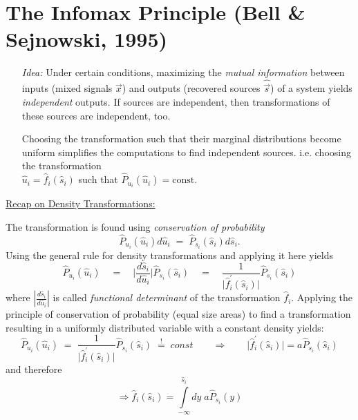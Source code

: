 
\section{The Infomax Principle (Bell \& Sejnowski, 1995)}

\begin{itemize}
\item[\emph{Idea:}] Under certain conditions, maximizing the
  \emph{mutual information} between inputs (mixed signals $\vec x$) and outputs
  (recovered sources $\widehat{\vec s}$) of a system yields \emph{independent} outputs. 
  If sources are independent, then
  transformations of these sources are independent, too.
  
  Choosing the transformation such that their marginal distributions become uniform 
  simplifies the computations to find independent sources. i.e. choosing the transformation \\
$\widehat{u}_i = \widehat{f}_i(\widehat{s}_i)$ such that
$\widehat{P}_{u_i}(\widehat{u}_i) = \mathrm{const.}$

\end{itemize}

\underline{Recap on Density Transformations:}

The transformation is found using \emph{conservation of probability}
\begin{equation}
	\widehat{P}_{u_i}(\widehat{u}_i) d \widehat{u}_i 
	\; =  \; \widehat{P}_{s_i} (\widehat{s}_i) d \widehat{s}_i.
\end{equation}
Using the general rule for density transformations and applying it here yields
\begin{equation}
\label{eq:conservation1}
	\widehat{P}_{u_i}(\widehat{u}_i) \quad
	 =  \quad \bigg| 
		\frac{d \widehat{s}_i}{d \widehat{u}_i} \bigg| 
			 \widehat{P}_{s_i}(\widehat{s}_i) \quad
	 =  \quad \frac{1}{\big| \widehat{f}_i^{'} (\widehat{s}_i) \big|} 
		\widehat{P}_{s_i}(\widehat{s}_i)
\end{equation}
where $\left|\frac{d \widehat{s}_i}{d \widehat{u}_i} \right|$ is
called \emph{functional determinant} of the transformation
$\widehat{f}_i$.
Applying the principle of conservation of probability (equal size
areas) to find a transformation resulting in a uniformly distributed
variable with a constant density yields: 
\begin{equation}
  \label{eq:dtufs}
		\widehat{P}_{u_i} (\widehat{u}_i) \; = \;   
		 \frac{1}{\big| \widehat{f}_i^{'} (\widehat{s}_i) \big|} 
		\widehat{P}_{s_i}(\widehat{s}_i) \; \stackrel{!}{=} \; const \qquad \Rightarrow \qquad 
		 \big| \widehat{f}_i^{'} (\widehat{s}_i) \big| =  a \widehat{P}_{s_i}(\widehat{s}_i) 
\end{equation}
and therefore
\begin{equation}
\Rightarrow \widehat{f}_i (\widehat{s}_i)
 = \int\limits_{-\infty}^{\widehat{s}_i} dy\; a 
			\widehat{P}_{s_i}(y)
\end{equation}

